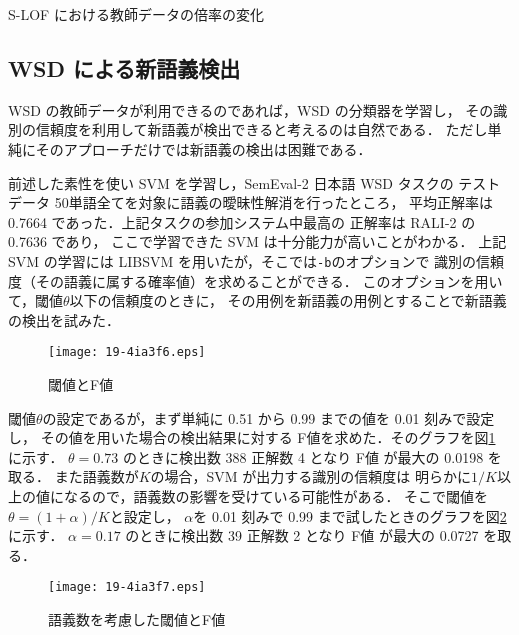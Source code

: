 \documentclass[japanese]{jnlp_1.4}
\begin{document}
\begin{table}[b]
\caption{S-LOF における教師データの倍率の変化}
\label{tab:jikken2-tuika}

\end{table}

\subsection{WSD による新語義検出}

WSD の教師データが利用できるのであれば，WSD の分類器を学習し，
その識別の信頼度を利用して新語義が検出できると考えるのは自然である．
ただし単純にそのアプローチだけでは新語義の検出は困難である．

前述した素性を使い SVM を学習し，SemEval-2 日本語 WSD タスクの
テストデータ 50単語全てを対象に語義の曖昧性解消を行ったところ，
平均正解率は 0.7664 であった．上記タスクの参加システム中最高の
正解率は RALI-2 の 0.7636 であり\cite{semeval-2010}，
ここで学習できた SVM は十分能力が高いことがわかる．
上記 SVM の学習には LIBSVM を用いたが，そこでは\verb|-b|のオプションで
識別の信頼度（その語義に属する確率値）を求めることができる．
このオプションを用いて，閾値\( \theta \)以下の信頼度のときに，
その用例を新語義の用例とすることで新語義の検出を試みた．

\begin{figure}[b]
\begin{center}
\texttt{[image: 19-4ia3f6.eps]}
\end{center}
\caption{閾値とF値}
\label{k-zettai}
\end{figure} 

閾値\( \theta \)の設定であるが，まず単純に 0.51 から 0.99 までの値を 0.01 刻みで設定し，
その値を用いた場合の検出結果に対する F値を求めた．そのグラフを図\ref{k-zettai} に示す．
\( \theta = 0.73\) のときに検出数 388 正解数 4 となり F値 が最大の 0.0198 を取る．
また語義数が\( K \)の場合，SVM が出力する識別の信頼度は
明らかに\( 1/K \)以上の値になるので，語義数の影響を受けている可能性がある．
そこで閾値を\( \theta = (1 + \alpha)/K \)と設定し，
\( \alpha \)を 0.01 刻みで 0.99 まで試したときのグラフを図\ref{k-soutai}に示す．
\( \alpha = 0.17\) のときに検出数 39 正解数 2 となり F値 が最大の 0.0727 を取る．

\begin{figure}[b]
\begin{center}
\texttt{[image: 19-4ia3f7.eps]}
\end{center}
\caption{語義数を考慮した閾値とF値}
\label{k-soutai}
\end{figure} 
\end{document}
